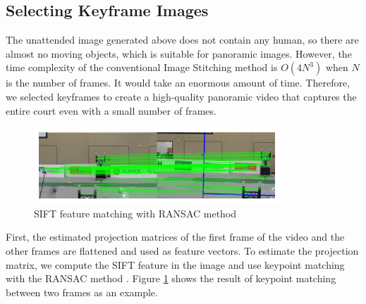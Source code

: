 \newpage


\subsection{Selecting Keyframe Images}
The unattended image generated above does not contain any human, so there are almost no moving objects, which is suitable for panoramic images. However, the time complexity of the conventional Image Stitching method \cite{brown2007automatic} is $O(4N^3)$ when $N$ is the number of frames. It would take an enormous amount of time. Therefore, we selected keyframes to create a high-quality panoramic video that captures the entire court even with a small number of frames.

\begin{figure}
	\includegraphics[width = \linewidth]{images/fencing/homography.png}
	\caption{SIFT feature matching with RANSAC method}
	\label{homo}
\end{figure}

First, the estimated projection matrices of the first frame of the video and the other frames are flattened and used as feature vectors. To estimate the projection matrix, we compute the SIFT feature \cite{lowe2004distinctive} in the image and use keypoint matching with the RANSAC method \cite{fischler1981random}. Figure \ref{homo} shows the result of keypoint matching between two frames as an example.

